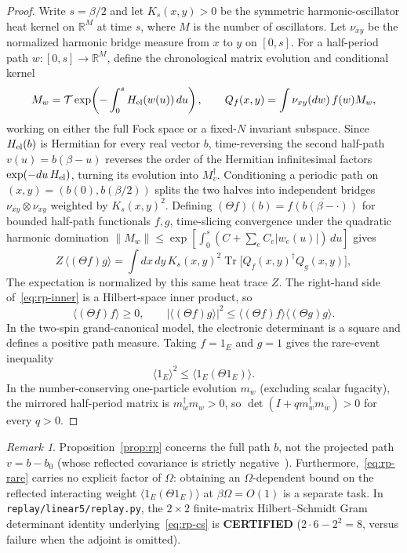 \documentclass[11pt]{article}
\theoremstyle{remark}
\newtheorem{remark}{Remark}
\DeclareMathOperator{\Tr}{Tr}
\newcommand{\certified}{\textbf{CERTIFIED}}
\begin{document}
\begin{proof}
Write $s=\beta/2$ and let $K_s(x,y)>0$ be the symmetric harmonic-oscillator heat kernel on $\mathbb R^M$ at time $s$, where $M$ is the number of oscillators. Let $\nu_{xy}$ be the normalized harmonic bridge measure from $x$ to $y$ on $[0,s]$. For a half-period path $w:[0,s]\to\mathbb R^M$, define the chronological matrix evolution and conditional kernel
\[
 M_w=\mathcal T\exp\!\left(-\int_0^s H_{\rm el}(w(u))\,du\right),\qquad
 Q_f(x,y)=\int \nu_{xy}(dw)\,f(w)M_w,
\]
working on either the full Fock space or a fixed-$N$ invariant subspace. Since $H_{\rm el}(b)$ is Hermitian for every real vector $b$, time-reversing the second half-path $v(u)=b(\beta-u)$ reverses the order of the Hermitian infinitesimal factors $\exp(-du\,H_{\rm el})$, turning its evolution into $M_v^\dagger$. Conditioning a periodic path on $(x,y)=(b(0),b(\beta/2))$ splits the two halves into independent bridges $\nu_{xy}\otimes\nu_{xy}$ weighted by $K_s(x,y)^2$. Defining $(\Theta f)(b)=\overline{f(b(\beta-\cdot))}$ for bounded half-path functionals $f,g$, time-slicing convergence under the quadratic harmonic domination $\|M_w\|\le \exp[\int_0^s (C+\sum_e C_e |w_e(u)|)\,du]$ gives
\begin{equation}\label{eq:rp-inner}
 Z\,\langle(\Theta f)g\rangle = \int dx\,dy\,K_s(x,y)^2\Tr\!\bigl[Q_f(x,y)^\dagger Q_g(x,y)\bigr],
\end{equation}
The expectation is normalized by this same heat trace $Z$. The right-hand side of~\eqref{eq:rp-inner} is a Hilbert-space inner product, so
\begin{equation}\label{eq:rp-cs}
 \langle(\Theta f)f\rangle \ge 0,\qquad |\langle(\Theta f)g\rangle|^2 \le \langle(\Theta f)f\rangle\langle(\Theta g)g\rangle.
\end{equation}
In the two-spin grand-canonical model, the electronic determinant is a square and defines a positive path measure. Taking $f=1_E$ and $g=1$ gives the rare-event inequality
\begin{equation}\label{eq:rp-rare}
 \langle 1_E\rangle^2 \le \langle 1_E(\Theta 1_E)\rangle.
\end{equation}
In the number-conserving one-particle evolution $m_w$ (excluding scalar fugacity), the mirrored half-period matrix is $m_w^\dagger m_w>0$, so $\det(I+q m_w^\dagger m_w)>0$ for every $q>0$.
\end{proof}

\begin{remark}
Proposition~\ref{prop:rp} concerns the full path $b$, not the projected path $v=b-b_0$ (whose reflected covariance is strictly negative~\cite{linear4}). Furthermore,~\eqref{eq:rp-rare} carries no explicit factor of $\Omega$: obtaining an $\Omega$-dependent bound on the reflected interacting weight $\langle 1_E(\Theta 1_E)\rangle$ at $\beta\Omega=O(1)$ is a separate task. In \texttt{replay/linear5/replay.py}, the $2\times 2$ finite-matrix Hilbert--Schmidt Gram determinant identity underlying~\eqref{eq:rp-cs} is \certified{} ($2\cdot 6 - 2^2=8$, versus failure when the adjoint is omitted).
\end{remark}
\end{document}
